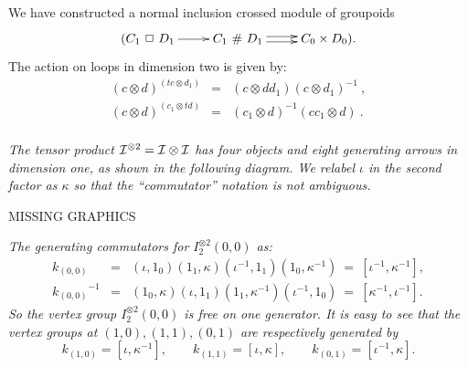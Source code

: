 \noindent
We have constructed a normal inclusion crossed module of groupoids 
$$
\xymatrix{
(C_1\ \Box\ D_1 \ar[r] 
  &  C_1\ \#\ D_1 \ar[r]<+0.5ex>\ar[r]<-0.5ex>
     &  C_0 \times D_0).  
}$$
The action on loops in dimension two is given by: 
\begin{eqnarray*}
(c \otimes d)^{(tc \otimes d_1)} &=& (c \otimes dd_1)(c \otimes d_1)^{-1}\ ,\\
(c \otimes d)^{(c_1 \otimes td)} &=& (c_1 \otimes d)^{-1}(cc_1 \otimes d)\ .\\
\end{eqnarray*}

\newpage
\begin{example} \label{ex:itensori}
\emph{The tensor product $\mathcal{I}^{\otimes 2} = \mathcal{I}\otimes\mathcal{I}$ 
has four objects and eight generating arrows in dimension one, 
as shown in the following diagram. 
We relabel $\iota$ in the second factor as $\kappa$ 
so that the ``commutator'' notation is not ambiguous.} 

\begin{center}
MISSING GRAPHICS
\end{center}
\emph{The generating commutators for $I^{\otimes 2}_2(0,0)$ as:} 
\begin{eqnarray*}
k_{(0,0)} 
  &=& (\iota,1_0)(1_1,\kappa)(\iota^{-1},1_1)(1_0,\kappa^{-1}) 
  ~=~ [\iota^{-1}, \kappa^{-1}], \\ 
{k_{(0,0)}}^{-1} 
  &=& (1_0,\kappa)(\iota,1_1)(1_1,\kappa^{-1})(\iota^{-1},1_0) 
  ~=~ [\kappa^{-1},\iota^{-1}]. 
\end{eqnarray*} 
\emph{So the vertex group $I^{\otimes 2}_2(0,0)$ is free on one generator. 
It is easy to see that the vertex groups at 
$(1,0), (1,1), (0,1)$ are respectively generated by} 
$$
k_{(1,0)} = [\iota, \kappa^{-1}], \qquad
k_{(1,1)} = [\iota, \kappa], \qquad
k_{(0,1)} = [\iota^{-1}, \kappa]. 
$$
\end{example}

